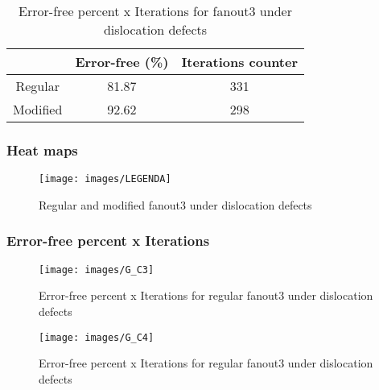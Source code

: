 \begin{table}[h]
\begin{center}
\begin{tabular}{|c|c|c|}
\hline
 & Error-free (\%) & Iterations counter \\
\hline
 Regular & 81.87 & 331 \\
\hline
 Modified & 92.62 & 298 \\
\hline

\end{tabular}
\caption{Error-free percent x Iterations for fanout3 under dislocation defects}
\end{center}
\end{table}

\subsubsection{Heat maps}

\begin{figure}[h]
\center
{}
\hfill
{}
\linebreak
{\texttt{[image: images/LEGENDA]}
}
\caption{Regular and modified fanout3 under dislocation defects}
\label{figure:fanout3_t2}
\end{figure}

\pagebreak
\subsubsection{Error-free percent x Iterations}

\begin{figure}[h!]
\center
\texttt{[image: images/G\_C3]}
\caption{Error-free percent x Iterations for regular fanout3 under dislocation defects}
\label{figure:fanout3_reg_gt2}
\end{figure}

\begin{figure}[h!]
\center
\texttt{[image: images/G\_C4]}
\caption{Error-free percent x Iterations for regular fanout3 under dislocation defects}
\label{figure:fanout3_mod_gt2}
\end{figure}
